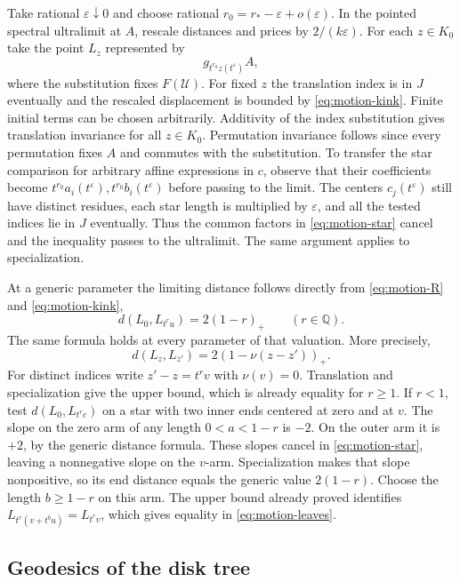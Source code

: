Take rational \(\varepsilon\downarrow0\) and choose rational
\(r_0=r_*-\varepsilon+o(\varepsilon)\). In the pointed spectral
ultralimit at \(A\), rescale distances and prices by \(2/(k\varepsilon)\).
For each \(z\in K_0\) take the point \(L_z\) represented by
\[
   g_{t^{r_0}z(t^\varepsilon)}A ,
\]
where the substitution fixes \(F(\mathcal U)\). For fixed \(z\) the
translation index is in \(J\) eventually and the rescaled displacement
is bounded by \eqref{eq:motion-kink}. Finite initial terms can be
chosen arbitrarily. Additivity of the index substitution gives
translation invariance for all \(z\in K_0\). Permutation invariance
follows since every permutation fixes \(A\) and commutes with the
substitution. To transfer the star comparison for arbitrary affine
expressions in \(c\), observe that their coefficients become
\(t^{r_0}a_i(t^\varepsilon),t^{r_0}b_i(t^\varepsilon)\) before passing
to the limit. The centers \(c_j(t^\varepsilon)\) still have distinct
residues, each star length is multiplied by \(\varepsilon\), and all
the tested indices lie in \(J\) eventually. Thus the common factors
in \eqref{eq:motion-star} cancel and the inequality passes to the
ultralimit. The same argument applies to specialization.

At a generic parameter the limiting distance follows directly from
\eqref{eq:motion-R} and \eqref{eq:motion-kink},
\[
 d(L_0,L_{t^ru})=2(1-r)_+
 \qquad(r\in\mathbb Q).
\]
The same formula holds at every parameter of that valuation. More
precisely,
\begin{equation}\label{eq:motion-leaves}
 d(L_z,L_{z'})=2(1-\nu(z-z'))_+ .
\end{equation}
For distinct indices write \(z'-z=t^r v\) with \(\nu(v)=0\).
Translation and specialization give the upper bound, which is already
equality for \(r\ge1\). If \(r<1\), test \(d(L_0,L_{t^rc})\) on a star
with two inner ends centered at zero and at \(v\). The slope on the
zero arm of any length \(0<a<1-r\) is \(-2\). On the outer arm it is
\(+2\), by the generic distance formula. These slopes cancel in
\eqref{eq:motion-star}, leaving a nonnegative slope on the \(v\)-arm.
Specialization makes that slope nonpositive, so its end distance
equals the generic value \(2(1-r)\). Choose the length \(b\ge1-r\) on
this arm. The upper bound already proved identifies
\(L_{t^r(v+t^bu)}=L_{t^rv}\), which gives equality in
\eqref{eq:motion-leaves}.

\subsection{Geodesics of the disk tree}

